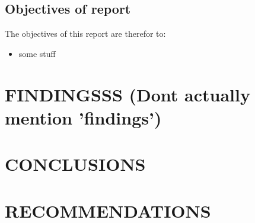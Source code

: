 \documentclass{article}
\begin{document}
\subsection{Objectives of report}
The objectives of this report are therefor to:
\begin{itemize}
	\item some stuff
\end{itemize}

\newpage
\section{FINDINGSSS (Dont actually mention 'findings')}

\newpage
\section{CONCLUSIONS}

\newpage
\section{RECOMMENDATIONS}

\newpage
\printbibliography
\end{document}

